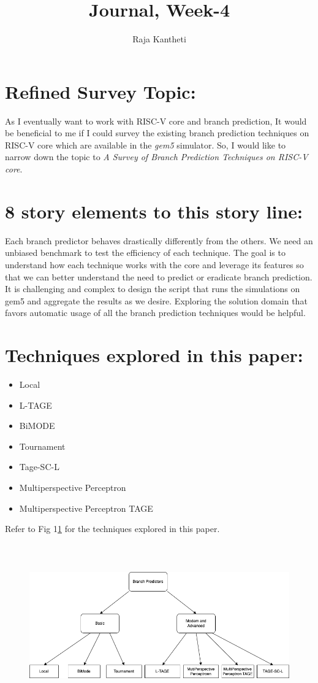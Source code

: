\documentclass[12pt]{article}
\title{Journal, Week-4}
\author{Raja Kantheti}
\begin{document}
\maketitle

\section*{Refined Survey Topic:}
As I eventually want to work with RISC-V core and branch prediction, It would be beneficial to me if
I could survey the existing branch prediction techniques on RISC-V core which are available in the \emph{gem5} simulator.
So, I would like to narrow down the topic to \emph{A Survey of Branch Prediction Techniques on RISC-V core}.

\section*{8 story elements to this story line:}
Each branch predictor behaves drastically differently from the others. We need an unbiased benchmark
to test the efficiency of each technique. The goal is to understand how each technique works with the core and leverage its features so that we can better understand the need to predict or eradicate branch prediction.
It is challenging and complex to design the script that runs the simulations on gem5 and aggregate the results as we 
desire. Exploring the solution domain that favors automatic usage of all the branch prediction techniques would be helpful.  
\section*{Techniques explored in this paper:}
\begin{itemize}
    \item Local
    \item L-TAGE
    \item BiMODE
    \item Tournament
    \item Tage-SC-L
    \item Multiperspective Perceptron
    \item Multiperspective Perceptron TAGE
\end{itemize}
Refer to Fig 1\ref{fig:mesh1} for the techniques explored in this paper.
\begin{figure}
    \includegraphics*[width=14cm, height = 7cm]{techniques.png} \label {fig:mesh1}
\end{figure}
\end{document}
